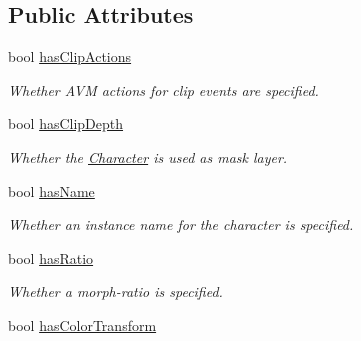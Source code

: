\subsection*{Public Attributes}
\begin{DoxyCompactItemize}
\item 
\hypertarget{classjswf_1_1flash_1_1tags_1_1_place_object2_tag_a6482e44e2236467464b8625fbf194987}{bool \hyperlink{classjswf_1_1flash_1_1tags_1_1_place_object2_tag_a6482e44e2236467464b8625fbf194987}{has\+Clip\+Actions}}\label{classjswf_1_1flash_1_1tags_1_1_place_object2_tag_a6482e44e2236467464b8625fbf194987}

\begin{DoxyCompactList}\small\item\em Whether {\ttfamily A\+V\+M} actions for clip events are specified. \end{DoxyCompactList}\item 
\hypertarget{classjswf_1_1flash_1_1tags_1_1_place_object2_tag_a4f323e7a2022f1594425e4e8e6297f59}{bool \hyperlink{classjswf_1_1flash_1_1tags_1_1_place_object2_tag_a4f323e7a2022f1594425e4e8e6297f59}{has\+Clip\+Depth}}\label{classjswf_1_1flash_1_1tags_1_1_place_object2_tag_a4f323e7a2022f1594425e4e8e6297f59}

\begin{DoxyCompactList}\small\item\em Whether the {\ttfamily \hyperlink{classjswf_1_1flash_1_1_character}{Character}} is used as mask layer. \end{DoxyCompactList}\item 
\hypertarget{classjswf_1_1flash_1_1tags_1_1_place_object2_tag_a5132e05f310ec25956ac1806c1f51764}{bool \hyperlink{classjswf_1_1flash_1_1tags_1_1_place_object2_tag_a5132e05f310ec25956ac1806c1f51764}{has\+Name}}\label{classjswf_1_1flash_1_1tags_1_1_place_object2_tag_a5132e05f310ec25956ac1806c1f51764}

\begin{DoxyCompactList}\small\item\em Whether an instance name for the character is specified. \end{DoxyCompactList}\item 
\hypertarget{classjswf_1_1flash_1_1tags_1_1_place_object2_tag_aa12915097ea248ec315f01d81a05dbba}{bool \hyperlink{classjswf_1_1flash_1_1tags_1_1_place_object2_tag_aa12915097ea248ec315f01d81a05dbba}{has\+Ratio}}\label{classjswf_1_1flash_1_1tags_1_1_place_object2_tag_aa12915097ea248ec315f01d81a05dbba}

\begin{DoxyCompactList}\small\item\em Whether a morph-\/ratio is specified. \end{DoxyCompactList}\item 
\hypertarget{classjswf_1_1flash_1_1tags_1_1_place_object2_tag_a3ddbe7d3c6bc121589251e530944ee0d}{bool \hyperlink{classjswf_1_1flash_1_1tags_1_1_place_object2_tag_a3ddbe7d3c6bc121589251e530944ee0d}{has\+Color\+Transform}}\label{classjswf_1_1flash_1_1tags_1_1_place_object2_tag_a3ddbe7d3c6bc121589251e530944ee0d}


\end{DoxyCompactItemize}
